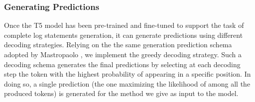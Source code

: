 \subsubsection{Generating Predictions}
Once the T5 model has been pre-trained and fine-tuned to support the task of complete log statements generation, it can generate predictions using different decoding strategies. Relying on the the same generation prediction schema adopted by Mastropaolo \etal \cite{mastropaolo2022using}, we implement the greedy decoding strategy. Such a decoding schema generates the final predictions by selecting at each decoding step the token with the highest probability of appearing in a specific position. In doing so, a single prediction (\ie the one maximizing the likelihood of among all the produced tokens) is generated for the method we give as input to the model.




